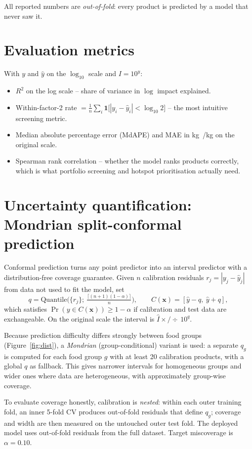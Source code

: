 All reported numbers are \emph{out-of-fold}: every product is predicted by a model that never saw it.

\section{Evaluation metrics}

With $y$ and $\hat y$ on the $\log_{10}$ scale and $I=10^y$:
\begin{itemize}
  \item $R^2$ on the log scale -- share of variance in $\log$ impact explained.
  \item Within-factor-2 rate $= \frac1n\sum_i \mathbf{1}\big[|y_i-\hat y_i|<\log_{10}2\big]$ --
  the most intuitive screening metric.
  \item Median absolute percentage error (MdAPE) and MAE in kg~\co/kg on the original scale.
  \item Spearman rank correlation -- whether the model ranks products correctly, which is what
  portfolio screening and hotspot prioritisation actually need.
\end{itemize}

\section{Uncertainty quantification: Mondrian split-conformal prediction}

Conformal prediction \citep{vovk2005,lei2018,angelopoulos2023} turns any point predictor into an
interval predictor with a distribution-free coverage guarantee. Given $n$ calibration residuals
$r_j=|y_j-\hat y_j|$ from data not used to fit the model, set
\[
  q = \text{Quantile}\Big(\{r_j\};\ \tfrac{\lceil (n+1)(1-\alpha)\rceil}{n}\Big), \qquad
  C(\mathbf{x}) = [\hat y - q,\ \hat y + q],
\]
which satisfies $\Pr(y\in C(\mathbf{x}))\ge 1-\alpha$ if calibration and test data are exchangeable.
On the original scale the interval is $\hat I \times\!/\!\div\, 10^{q}$.

Because prediction difficulty differs strongly between food groups (Figure~\ref{fig:dist}), a
\emph{Mondrian} (group-conditional) variant is used: a separate $q_g$ is computed for each food
group $g$ with at least 20 calibration products, with a global $q$ as fallback. This gives narrower
intervals for homogeneous groups and wider ones where data are heterogeneous, with approximately
group-wise coverage.

To evaluate coverage honestly, calibration is \emph{nested}: within each outer training fold, an
inner 5-fold CV produces out-of-fold residuals that define $q_g$; coverage and width are then
measured on the untouched outer test fold. The deployed model uses out-of-fold residuals from the
full dataset. Target miscoverage is $\alpha=0.10$.

